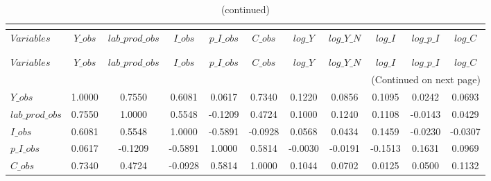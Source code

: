  
\begin{center}
\begin{longtable}{lcccccccccc} 
\caption{MATRIX OF CORRELATIONS}\\
 \label{Table:th_corr_matrix}\\
\toprule 
$Variables       $	 & 	 $           Y\_obs$	 & 	 $  lab\_prod\_obs$	 & 	 $           I\_obs$	 & 	 $       p\_I\_obs$	 & 	 $           C\_obs$	 & 	 $           log\_Y$	 & 	 $       log\_Y\_N$	 & 	 $           log\_I$	 & 	 $       log\_p\_I$	 & 	 $           log\_C$\\
\midrule \endfirsthead 
\caption{(continued)}\\
 \toprule \\ 
$Variables       $	 & 	 $           Y\_obs$	 & 	 $  lab\_prod\_obs$	 & 	 $           I\_obs$	 & 	 $       p\_I\_obs$	 & 	 $           C\_obs$	 & 	 $           log\_Y$	 & 	 $       log\_Y\_N$	 & 	 $           log\_I$	 & 	 $       log\_p\_I$	 & 	 $           log\_C$\\
\midrule \endhead 
\midrule \multicolumn{11}{r}{(Continued on next page)} \\ \bottomrule \endfoot 
\bottomrule \endlastfoot 
$Y\_obs          $	 & 	            1.0000	 & 	            0.7550	 & 	            0.6081	 & 	            0.0617	 & 	            0.7340	 & 	            0.1220	 & 	            0.0856	 & 	            0.1095	 & 	            0.0242	 & 	            0.0693 \\ 
$lab\_prod\_obs  $	 & 	            0.7550	 & 	            1.0000	 & 	            0.5548	 & 	           -0.1209	 & 	            0.4724	 & 	            0.1000	 & 	            0.1240	 & 	            0.1108	 & 	           -0.0143	 & 	            0.0429 \\ 
$I\_obs          $	 & 	            0.6081	 & 	            0.5548	 & 	            1.0000	 & 	           -0.5891	 & 	           -0.0928	 & 	            0.0568	 & 	            0.0434	 & 	            0.1459	 & 	           -0.0230	 & 	           -0.0307 \\ 
$p\_I\_obs       $	 & 	            0.0617	 & 	           -0.1209	 & 	           -0.5891	 & 	            1.0000	 & 	            0.5814	 & 	           -0.0030	 & 	           -0.0191	 & 	           -0.1513	 & 	            0.1631	 & 	            0.0969 \\ 
$C\_obs          $	 & 	            0.7340	 & 	            0.4724	 & 	           -0.0928	 & 	            0.5814	 & 	            1.0000	 & 	            0.1044	 & 	            0.0702	 & 	            0.0125	 & 	            0.0500	 & 	            0.1132 \\ 

\end{longtable}
\end{center}
